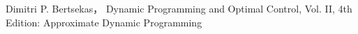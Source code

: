 \begin{thebibliography}{99}
 Dimitri P. Bertsekas， Dynamic Programming and Optimal Control, Vol. II, 4th Edition: Approximate Dynamic Programming
\end{thebibliography}

